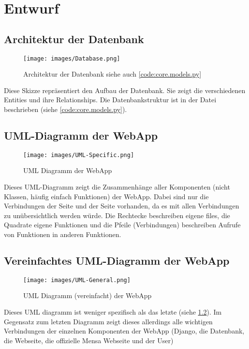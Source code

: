 \chapter{Entwurf} \label{chap:entwurf}

\section{Architektur der Datenbank} \label{sec:DB}
\begin{figure}[ht]
    \centering
    \texttt{[image: images/Database.png]}
    \caption{Architektur der Datenbank siehe auch \ref{code:core.models.py}}
    \label{fig:DB}
\end{figure}

Diese Skizze repräsentiert den Aufbau der Datenbank. Sie zeigt die verschiedenen
Entities und ihre Relationships. Die Datenbankstruktur ist in der Datei
 beschrieben (siehe \ref{code:core.models.py}).

\section{UML-Diagramm der WebApp} \label{sec:UMLS}
\begin{figure}[ht]
    \centering
    \texttt{[image: images/UML-Specific.png]}
    \caption{UML Diagramm der WebApp}
    \label{fig:DB}
\end{figure}

Dieses UML-Diagramm zeigt die Zusammenhänge aller Komponenten (nicht Klassen,
häufig einfach Funktionen) der WebApp. Dabei sind nur die Verbindungen der
 Seite und der  Seite vorhanden, da es mit allen
Verbindungen zu unübersichtlich werden würde. Die Rechtecke beschreiben eigene
files, die Quadrate eigene Funktionen und die Pfeile (Verbindungen) beschreiben
Aufrufe von Funktionen in anderen Funktionen.

\newpage

\section{Vereinfachtes UML-Diagramm der WebApp} \label{sec:UMLG}
\begin{figure}[ht]
    \centering
    \texttt{[image: images/UML-General.png]}
    \caption{UML Diagramm (vereinfacht) der WebApp}
    \label{fig:DB}
\end{figure}

Dieses UML diagramm ist weniger spezifisch als das letzte (siehe
\ref{sec:UMLS}). Im Gegensatz zum letzten Diagramm zeigt dieses allerdings alle
wichtigen Verbindungen der einzelnen Komponenten der WebApp (Django, die
Datenbank, die Webseite, die offizielle Mensa Webseite und der User)



